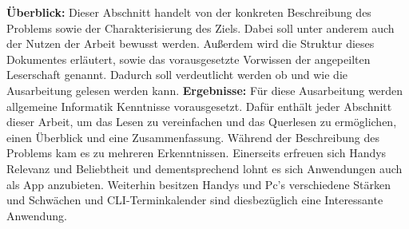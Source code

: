 \myCheckmark

\textbf{Überblick:}
Dieser Abschnitt handelt von der konkreten Beschreibung des Problems sowie der Charakterisierung des Ziels. Dabei soll unter anderem auch der Nutzen der Arbeit bewusst werden.\newline
Außerdem wird die Struktur dieses Dokumentes erläutert, sowie das vorausgesetzte Vorwissen der angepeilten Leserschaft genannt. Dadurch soll verdeutlicht werden ob und wie die Ausarbeitung gelesen werden kann.\newline
\textbf{Ergebnisse:}
Für diese Ausarbeitung werden allgemeine Informatik Kenntnisse vorausgesetzt. Dafür enthält jeder Abschnitt dieser Arbeit, um das Lesen zu vereinfachen und das Querlesen zu ermöglichen, einen Überblick und eine Zusammenfassung.\newline
Während der Beschreibung des Problems kam es zu mehreren Erkenntnissen. Einerseits erfreuen sich Handys Relevanz und Beliebtheit und dementsprechend lohnt es sich Anwendungen auch als App anzubieten. Weiterhin besitzen Handys und Pc's verschiedene Stärken und Schwächen und CLI-Terminkalender sind diesbezüglich eine Interessante Anwendung.